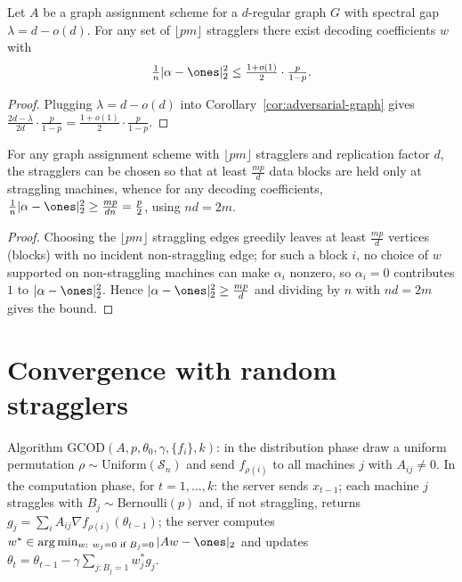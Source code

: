 \begin{corollary}
  \label{cor:adversarial-expander}
  Let $A$ be a graph assignment scheme for a $d$-regular graph $G$ with spectral
  gap $\lambda = d - o(d)$. For any set of $\lfloor pm\rfloor$ stragglers there
  exist decoding coefficients $w$ with
  \[
    \tfrac1n|\alpha - \ones|_2^2 \le \tfrac{1+o(1)}{2}\cdot\tfrac{p}{1-p}.
  \]
\end{corollary}
\begin{proof}
  Plugging $\lambda = d - o(d)$ into Corollary~\ref{cor:adversarial-graph} gives
  $\tfrac{2d-\lambda}{2d}\cdot\tfrac{p}{1-p} = \tfrac{1+o(1)}{2}\cdot\tfrac{p}{1-p}$.
\end{proof}

\begin{proposition}
  \label{prop:adversarial-tight}
  For any graph assignment scheme with $\lfloor pm\rfloor$ stragglers and
  replication factor $d$, the stragglers can be chosen so that at least
  $\tfrac{mp}{d}$ data blocks are held only at straggling machines, whence for
  any decoding coefficients, $\tfrac1n|\alpha - \ones|_2^2 \ge \tfrac{mp}{dn}
  = \tfrac{p}{2}$, using $nd = 2m$.
\end{proposition}
\begin{proof}
  Choosing the $\lfloor pm\rfloor$ straggling edges greedily leaves at least
  $\tfrac{mp}{d}$ vertices (blocks) with no incident non-straggling edge; for
  such a block $i$, no choice of $w$ supported on non-straggling machines can make
  $\alpha_i$ nonzero, so $\alpha_i = 0$ contributes $1$ to $|\alpha - \ones|_2^2$.
  Hence $|\alpha - \ones|_2^2 \ge \tfrac{mp}{d}$ and dividing by $n$ with
  $nd = 2m$ gives the bound.
\end{proof}

\chapter{Convergence with random stragglers}

\begin{definition}
  \label{alg:gcod}
  Algorithm GCOD$(A, p, \theta_0, \gamma, \{f_i\}, k)$: in the distribution
  phase draw a uniform permutation $\rho \sim \mathrm{Uniform}(\mathcal{S}_n)$ and
  send $f_{\rho(i)}$ to all machines $j$ with $A_{ij} \neq 0$. In the computation
  phase, for $t = 1,\dots,k$: the server sends $x_{t-1}$; each machine $j$
  straggles with $B_j \sim \mathrm{Bernoulli}(p)$ and, if not straggling, returns
  $g_j = \sum_i A_{ij}\nabla f_{\rho(i)}(\theta_{t-1})$; the server computes
  $w^* \in \arg\min_{w :\ w_j = 0 \text{ if } B_j = 0}|Aw - \ones|_2$ and updates
  $\theta_t = \theta_{t-1} - \gamma\sum_{j : B_j = 1} w^*_j g_j$.
\end{definition}

